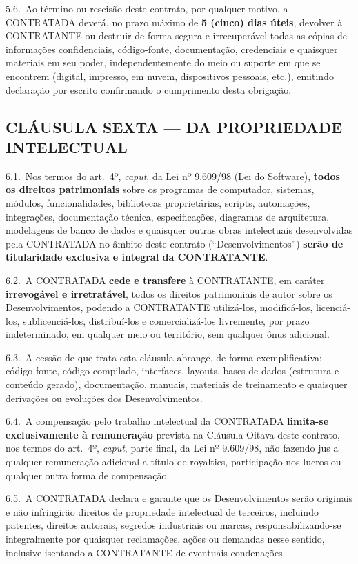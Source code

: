 \documentclass[11pt, a4paper]{article}
\begin{document}
5.6.\ Ao término ou rescisão deste contrato, por qualquer motivo, a CONTRATADA deverá, no prazo máximo de \textbf{5 (cinco) dias úteis}, devolver à CONTRATANTE ou destruir de forma segura e irrecuperável todas as cópias de informações confidenciais, código-fonte, documentação, credenciais e quaisquer materiais em seu poder, independentemente do meio ou suporte em que se encontrem (digital, impresso, em nuvem, dispositivos pessoais, etc.), emitindo declaração por escrito confirmando o cumprimento desta obrigação.

\subsection{CLÁUSULA SEXTA — DA PROPRIEDADE INTELECTUAL}

6.1.\ Nos termos do art.\ 4º, \textit{caput}, da Lei nº 9.609/98 (Lei do Software), \textbf{todos os direitos patrimoniais} sobre os programas de computador, sistemas, módulos, funcionalidades, bibliotecas proprietárias, scripts, automações, integrações, documentação técnica, especificações, diagramas de arquitetura, modelagens de banco de dados e quaisquer outras obras intelectuais desenvolvidas pela CONTRATADA no âmbito deste contrato (``Desenvolvimentos'') \textbf{serão de titularidade exclusiva e integral da CONTRATANTE}.

6.2.\ A CONTRATADA \textbf{cede e transfere} à CONTRATANTE, em caráter \textbf{irrevogável e irretratável}, todos os direitos patrimoniais de autor sobre os Desenvolvimentos, podendo a CONTRATANTE utilizá-los, modificá-los, licenciá-los, sublicenciá-los, distribuí-los e comercializá-los livremente, por prazo indeterminado, em qualquer meio ou território, sem qualquer ônus adicional.

6.3.\ A cessão de que trata esta cláusula abrange, de forma exemplificativa: código-fonte, código compilado, interfaces, layouts, bases de dados (estrutura e conteúdo gerado), documentação, manuais, materiais de treinamento e quaisquer derivações ou evoluções dos Desenvolvimentos.

6.4.\ A compensação pelo trabalho intelectual da CONTRATADA \textbf{limita-se exclusivamente à remuneração} prevista na Cláusula Oitava deste contrato, nos termos do art.\ 4º, \textit{caput}, parte final, da Lei nº 9.609/98, não fazendo jus a qualquer remuneração adicional a título de royalties, participação nos lucros ou qualquer outra forma de compensação.

6.5.\ A CONTRATADA declara e garante que os Desenvolvimentos serão originais e não infringirão direitos de propriedade intelectual de terceiros, incluindo patentes, direitos autorais, segredos industriais ou marcas, responsabilizando-se integralmente por quaisquer reclamações, ações ou demandas nesse sentido, inclusive isentando a CONTRATANTE de eventuais condenações.
\end{document}
